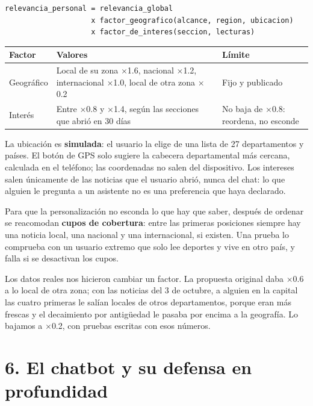 \documentclass[12pt,a4paper]{article}
\begin{document}
\begin{verbatim}
relevancia_personal = relevancia_global
                    x factor_geografico(alcance, region, ubicacion)
                    x factor_de_interes(seccion, lecturas)
\end{verbatim}

\begin{center}
\renewcommand{\arraystretch}{1.35}
\begin{tabular}{|>{\raggedright\arraybackslash}p{3cm}|>{\raggedright\arraybackslash}p{6.4cm}|>{\raggedright\arraybackslash}p{4.2cm}|}
\hline
\textbf{Factor} & \textbf{Valores} & \textbf{Límite} \\
\hline
Geográfico & Local de su zona $\times$1.6, nacional $\times$1.2, internacional $\times$1.0, local de
otra zona $\times$0.2 & Fijo y publicado \\
\hline
Interés & Entre $\times$0.8 y $\times$1.4, según las secciones que abrió en 30 días & No baja de
$\times$0.8: reordena, no esconde \\
\hline
\end{tabular}
\end{center}

La ubicación es \textbf{simulada}: el usuario la elige de una lista de 27 departamentos y países. El
botón de GPS solo sugiere la cabecera departamental más cercana, calculada en el teléfono; las
coordenadas no salen del dispositivo. Los intereses salen únicamente de las noticias que el usuario
abrió, nunca del chat: lo que alguien le pregunta a un asistente no es una preferencia que haya
declarado.

Para que la personalización no esconda lo que hay que saber, después de ordenar se reacomodan
\textbf{cupos de cobertura}: entre las primeras posiciones siempre hay una noticia local, una
nacional y una internacional, si existen. Una prueba lo comprueba con un usuario extremo que solo
lee deportes y vive en otro país, y falla si se desactivan los cupos.

Los datos reales nos hicieron cambiar un factor. La propuesta original daba $\times$0.6 a lo local
de otra zona; con las noticias del 3 de octubre, a alguien en la capital las cuatro primeras le
salían locales de otros departamentos, porque eran más frescas y el decaimiento por antigüedad le
pasaba por encima a la geografía. Lo bajamos a $\times$0.2, con pruebas escritas con esos números.

\section{6. El chatbot y su defensa en profundidad}
\end{document}
